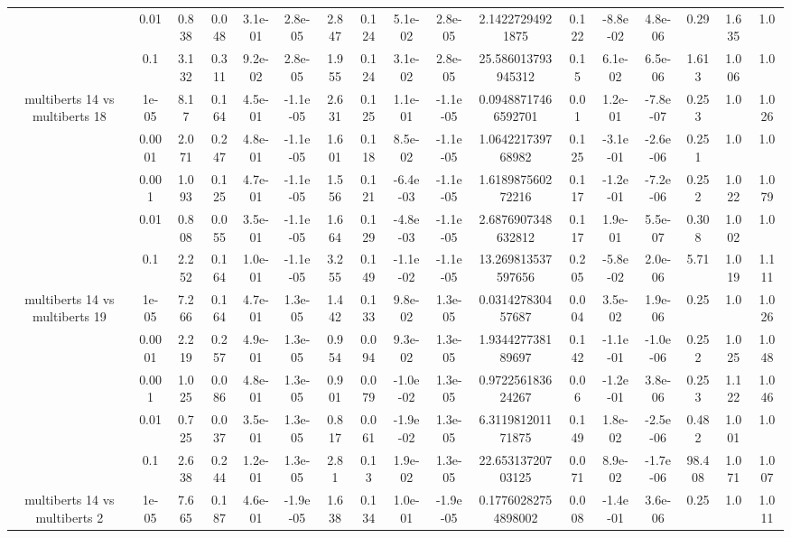 \begin{tabular}{|c|c|c|c|c|c|c|c|c|c|c|c|c|c|c|c|c|}
 & 0.01 & 0.838 & 0.048 & 3.1e-01 & 2.8e-05 & 2.847 & 0.124 & 5.1e-02 & 2.8e-05 & 2.14227294921875 & 0.122 & -8.8e-02 & 4.8e-06 & 0.29 & 1.635 & 1.0 \\
 & 0.1 & 3.132 & 0.311 & 9.2e-02 & 2.8e-05 & 1.955 & 0.124 & 3.1e-02 & 2.8e-05 & 25.586013793945312 & 0.15 & 6.1e-02 & 6.5e-06 & 1.613 & 1.006 & 1.0 \\
\hline
\multirow{5}{*}{multiberts 14 vs multiberts 18} & 1e-05 & 8.17 & 0.164 & 4.5e-01 & -1.1e-05 & 2.631 & 0.125 & 1.1e-01 & -1.1e-05 & 0.09488717466592701 & 0.01 & 1.2e-01 & -7.8e-07 & 0.253 & 1.0 & 1.026 \\
 & 0.0001 & 2.071 & 0.247 & 4.8e-01 & -1.1e-05 & 1.601 & 0.118 & 8.5e-02 & -1.1e-05 & 1.064221739768982 & 0.125 & -3.1e-01 & -2.6e-06 & 0.251 & 1.0 & 1.0 \\
 & 0.001 & 1.093 & 0.125 & 4.7e-01 & -1.1e-05 & 1.556 & 0.121 & -6.4e-03 & -1.1e-05 & 1.618987560272216 & 0.117 & -1.2e-01 & -7.2e-06 & 0.252 & 1.022 & 1.079 \\
 & 0.01 & 0.808 & 0.055 & 3.5e-01 & -1.1e-05 & 1.664 & 0.129 & -4.8e-03 & -1.1e-05 & 2.6876907348632812 & 0.117 & 1.9e-01 & 5.5e-07 & 0.308 & 1.002 & 1.0 \\
 & 0.1 & 2.252 & 0.164 & 1.0e-01 & -1.1e-05 & 3.255 & 0.149 & -1.1e-02 & -1.1e-05 & 13.269813537597656 & 0.205 & -5.8e-02 & 2.0e-06 & 5.71 & 1.019 & 1.111 \\
\hline
\multirow{5}{*}{multiberts 14 vs multiberts 19} & 1e-05 & 7.266 & 0.164 & 4.7e-01 & 1.3e-05 & 1.442 & 0.133 & 9.8e-02 & 1.3e-05 & 0.031427830457687 & 0.004 & 3.5e-02 & 1.9e-06 & 0.25 & 1.0 & 1.026 \\
 & 0.0001 & 2.219 & 0.257 & 4.9e-01 & 1.3e-05 & 0.954 & 0.094 & 9.3e-02 & 1.3e-05 & 1.934427738189697 & 0.142 & -1.1e-01 & -1.0e-06 & 0.252 & 1.025 & 1.048 \\
 & 0.001 & 1.025 & 0.086 & 4.8e-01 & 1.3e-05 & 0.901 & 0.079 & -1.0e-02 & 1.3e-05 & 0.972256183624267 & 0.06 & -1.2e-01 & 3.8e-06 & 0.253 & 1.122 & 1.046 \\
 & 0.01 & 0.725 & 0.037 & 3.5e-01 & 1.3e-05 & 0.817 & 0.061 & -1.9e-02 & 1.3e-05 & 6.311981201171875 & 0.149 & 1.8e-02 & -2.5e-06 & 0.482 & 1.001 & 1.0 \\
 & 0.1 & 2.638 & 0.244 & 1.2e-01 & 1.3e-05 & 2.81 & 0.13 & 1.9e-02 & 1.3e-05 & 22.65313720703125 & 0.071 & 8.9e-02 & -1.7e-06 & 98.408 & 1.071 & 1.007 \\
\hline
\multirow{5}{*}{multiberts 14 vs multiberts 2} & 1e-05 & 7.665 & 0.187 & 4.6e-01 & -1.9e-05 & 1.638 & 0.134 & 1.0e-01 & -1.9e-05 & 0.17760282754898002 & 0.008 & -1.4e-01 & 3.6e-06 & 0.25 & 1.0 & 1.011 \\

\end{tabular}
